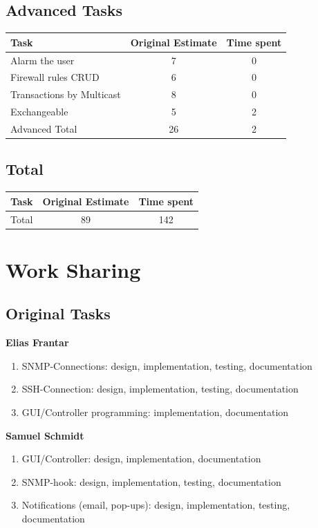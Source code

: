 \documentclass[11pt, a4paper]{article}
\begin{document}
\subsection{Advanced Tasks}
\begin{tabular} {| l | c | c |}\hline
Task &	Original Estimate & Time spent \\ \hline
Alarm the user &	7	& 0 \\ \hline
Firewall rules CRUD &	6 & 	0 \\ \hline
Transactions by Multicast &	8  &	0 \\ \hline
Exchangeable & 5 & 2 \\ \hline
Advanced Total & 26 &	2 \\ \hline
\end{tabular}

\subsection{Total}
\begin{tabular} {| l | c | c |}\hline
	Task &	Original Estimate & Time spent \\ \hline
	Total & 89 & 142 \\ \hline
\end{tabular}

\newpage

\section{Work Sharing}

\subsection{Original Tasks}

\textbf{Elias Frantar}
\begin{enumerate}[noitemsep]
	\item SNMP-Connections: design, implementation, testing, documentation
	\item SSH-Connection: design, implementation, testing, documentation
	\item GUI/Controller programming: implementation, documentation
\end{enumerate}

\textbf{Samuel Schmidt}
\begin{enumerate}[noitemsep]
	\item GUI/Controller: design, implementation, documentation
	\item SNMP-hook: design, implementation, testing, documentation
	\item Notifications (email, pop-ups): design, implementation, testing, documentation
\end{enumerate}
\end{document}
